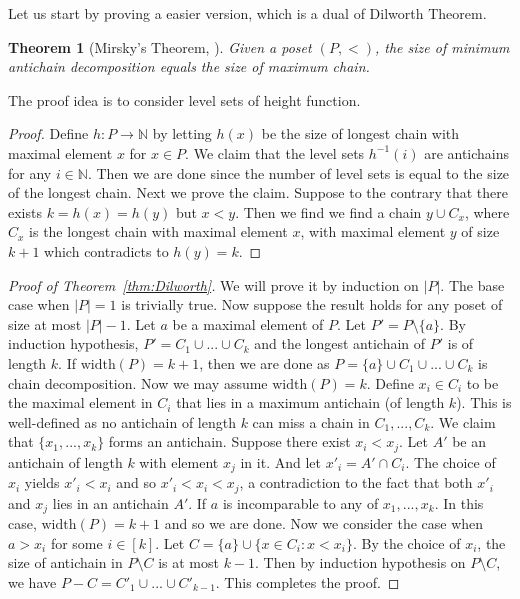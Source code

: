 \documentclass{article}
\newtheorem{theorem}{Theorem}[section]
\theoremstyle{definition}
\begin{document}
Let us start by proving a easier version, which is a dual of Dilworth Theorem. 

\begin{theorem}[Mirsky's Theorem, \cite{mirsky1971dual}]
    Given a poset $(P,<)$, the size of minimum antichain decomposition equals the size of maximum chain.
\end{theorem}

The proof idea is to consider level sets of height function.

\begin{proof}
    Define $h: P \to \mathbb{N}$ by letting $h(x)$ be the size of longest chain with maximal element $x$ for $x \in P$. We claim that the level sets $h^{-1}(i)$ are antichains for any $i\in \mathbb{N}$. Then we are done since the number of level sets is equal to the size of the longest chain. Next we prove the claim. Suppose to the contrary that there exists $k = h(x) = h(y)$ but $x < y$. Then we find we find a chain $y \cup C_x$, where $C_x$ is the longest chain with maximal element $x$, with maximal element $y$ of size $k+1$ which contradicts to $h(y) = k$.
\end{proof}


\begin{proof}[Proof of Theorem~\ref{thm:Dilworth}]
    We will prove it by induction on $|P|$. The base case when $|P|=1$ is trivially true. Now suppose the result holds for any poset of size at most $|P|-1$. Let $a$ be a maximal element of $P$. Let $P' = P \setminus \{a\}$. By induction hypothesis, $P' = C_1 \cup ... \cup C_k$ and the longest antichain of $P'$ is of length $k$. If $\text{width}(P) = k+1$, then we are done as $P=\{a\} \cup C_1 \cup ...\cup C_k$ is chain decomposition. Now we may assume $\text{width}(P) = k$. Define $x_i \in C_i$ to be the maximal element in $C_i$ that lies in a maximum antichain (of length $k$). This is well-defined as no antichain of length $k$ can miss a chain in $C_1, ..., C_k$. We claim that $\{x_1,...,x_k\}$ forms an antichain. Suppose there exist $x_i < x_j$. Let $A'$ be an antichain of length $k$ with element $x_j$ in it. And let $x'_i = A' \cap C_i$. The choice of $x_i$ yields $x'_i < x_i$ and so $x'_i < x_i < x_j$, a contradiction to the fact that both $x'_i$ and $x_j$ lies in an antichain $A'$. If $a$ is incomparable to any of $x_1,...,x_k$. In this case, $\text{width}(P)=k+1$ and so we are done. Now we consider the case when $a > x_i$ for some $i \in [k]$. Let $C = \{a\} \cup \{x\in C_i : x<x_i\}$. By the choice of $x_i$, the size of antichain in $P\setminus C$ is at most $k-1$. Then by induction hypothesis on $P\setminus C$, we have $P-C = C'_1 \cup ... \cup C'_{k-1}$. This completes the proof.
\end{proof}
\end{document}
